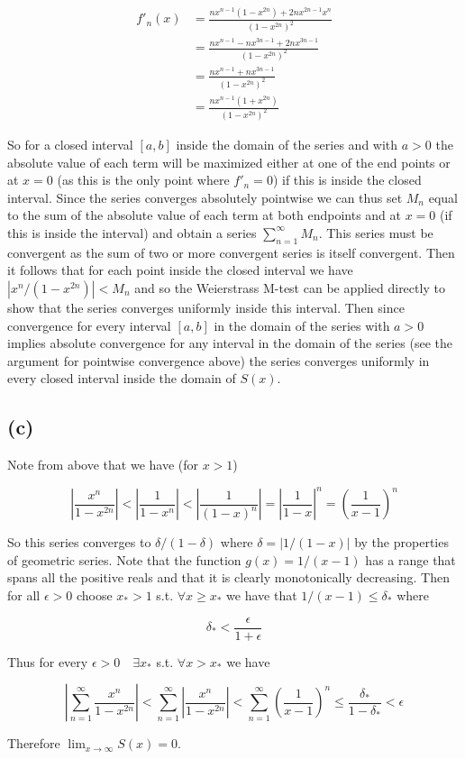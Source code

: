 \documentclass{article}
\begin{document}
\begin{align*}
	f'_n(x) &= \frac{nx^{n-1}(1-x^{2n}) + 2nx^{2n-1}x^n}{(1-x^{2n})^2} \\
	&= \frac{nx^{n-1}-nx^{3n-1} + 2nx^{3n-1}}{(1-x^{2n})^2} \\
	&= \frac{nx^{n-1}+nx^{3n-1}}{(1-x^{2n})^2} \\
	&= \frac{nx^{n-1}(1 + x^{2n})}{(1-x^{2n})^2}
\end{align*}

So for a closed interval $[a,b]$ inside the domain of the series and with $a > 0$
 the absolute value of each term will be maximized either at 
one of the end points or at $x=0$ (as this is the only point where $f'_n = 0$) if this is inside the closed interval. Since the series 
converges absolutely pointwise we can thus set $M_n$ equal to the sum of the absolute value of each term at both endpoints and at $x=0$ (if this 
is inside the interval) and obtain a series $\sum_{n=1}^{\infty}M_n$. This series must be convergent 
as the sum of two or more convergent series is itself convergent. Then it follows that for each 
point inside the closed interval we have $|x^n/(1-x^{2n})| < M_n$ and so the Weierstrass M-test 
can be applied directly to show that the series converges uniformly inside this interval. Then 
since convergence for every interval $[a,b]$ in the domain of the series with $a > 0$ implies absolute 
convergence for any interval in the domain of the series (see the argument for pointwise 
convergence above) the series converges uniformly in every 
closed interval inside the domain of $S(x)$.

\subsection*{(c)}
Note from above that we have (for $x > 1$)

\begin{equation*}
	\left|\frac{x^n}{1-x^{2n}}\right| < \left|\frac{1}{1-x^n}\right| < \left|\frac{1}{(1-x)^n}\right| = \left|\frac{1}{1-x}\right|^n = \left(\frac{1}{x-1}\right)^n
\end{equation*}

So this series converges to $\delta/(1-\delta)$ where $\delta = |1/(1-x)|$ by the properties of 
geometric series. Note that the function $g(x) = 1/(x-1)$ has a range that spans all the 
positive reals and that it is clearly monotonically decreasing.
Then for all $\epsilon > 0$ choose $x_* > 1$ s.t. $\forall x \geq x_*$ we have that 
$1/(x-1) \leq \delta_*$ where

\begin{equation*}
	\delta_* < \frac{\epsilon}{1+\epsilon}
\end{equation*}

Thus for every $\epsilon > 0 \quad \exists x_*$ s.t. $\forall x > x_*$ we have 

\begin{equation*}
	\left|\sum_{n=1}^{\infty}\frac{x^n}{1-x^{2n}}\right|<\sum_{n=1}^{\infty}\left|\frac{x^n}{1-x^{2n}}\right| < \sum_{n=1}^{\infty}\left(\frac{1}{x-1}\right)^n \leq \frac{\delta_*}{1-\delta_*}<\epsilon
\end{equation*}

Therefore $\lim_{x \rightarrow \infty}S(x) = 0$. 
\end{document}
